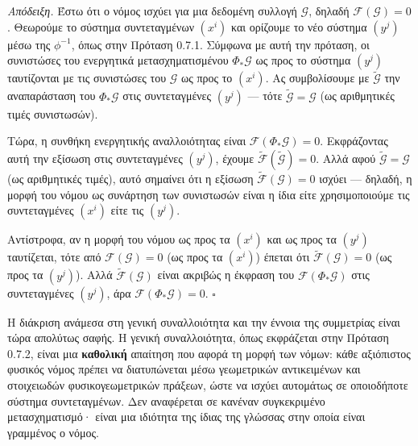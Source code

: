 \documentclass[12pt]{article}
\begin{document}
\textit{Απόδειξη.} Έστω ότι ο νόμος ισχύει για μια δεδομένη συλλογή $\mathcal{G}$, δηλαδή $\mathcal{F}(\mathcal{G}) = 0$. Θεωρούμε το σύστημα συντεταγμένων $(x^i)$ και ορίζουμε το νέο σύστημα $(y^j)$ μέσω της $\phi^{-1}$, όπως στην Πρόταση 0.7.1. Σύμφωνα με αυτή την πρόταση, οι συνιστώσες του ενεργητικά μετασχηματισμένου $\Phi_* \mathcal{G}$ ως προς το σύστημα $(y^j)$ ταυτίζονται με τις συνιστώσες του $\mathcal{G}$ ως προς το $(x^i)$. Ας συμβολίσουμε με $\tilde{\mathcal{G}}$ την αναπαράσταση του $\Phi_* \mathcal{G}$ στις συντεταγμένες $(y^j)$ — τότε $\tilde{\mathcal{G}} = \mathcal{G}$ (ως αριθμητικές τιμές συνιστωσών).

Τώρα, η συνθήκη ενεργητικής αναλλοιότητας είναι $\mathcal{F}(\Phi_* \mathcal{G}) = 0$. Εκφράζοντας αυτή την εξίσωση στις συντεταγμένες $(y^j)$, έχουμε $\tilde{\mathcal{F}}(\tilde{\mathcal{G}}) = 0$. Αλλά αφού $\tilde{\mathcal{G}} = \mathcal{G}$ (ως αριθμητικές τιμές), αυτό σημαίνει ότι η εξίσωση $\tilde{\mathcal{F}}(\mathcal{G}) = 0$ ισχύει — δηλαδή, η μορφή του νόμου ως συνάρτηση των συνιστωσών είναι η ίδια είτε χρησιμοποιούμε τις συντεταγμένες $(x^i)$ είτε τις $(y^j)$.

Αντίστροφα, αν η μορφή του νόμου ως προς τα $(x^i)$ και ως προς τα $(y^j)$ ταυτίζεται, τότε από $\mathcal{F}(\mathcal{G}) = 0$ (ως προς τα $(x^i)$) έπεται ότι $\tilde{\mathcal{F}}(\mathcal{G}) = 0$ (ως προς τα $(y^j)$). Αλλά $\tilde{\mathcal{F}}(\mathcal{G})$ είναι ακριβώς η έκφραση του $\mathcal{F}(\Phi_* \mathcal{G})$ στις συντεταγμένες $(y^j)$, άρα $\mathcal{F}(\Phi_* \mathcal{G}) = 0$. $\square$

Η διάκριση ανάμεσα στη γενική συναλλοιότητα και την έννοια της συμμετρίας είναι τώρα απολύτως σαφής. Η γενική συναλλοιότητα, όπως εκφράζεται στην Πρόταση 0.7.2, είναι μια \textbf{καθολική} απαίτηση που αφορά τη μορφή των νόμων: κάθε αξιόπιστος φυσικός νόμος πρέπει να διατυπώνεται μέσω γεωμετρικών αντικειμένων και στοιχειωδών φυσικογεωμετρικών πράξεων, ώστε να ισχύει αυτομάτως σε οποιοδήποτε σύστημα συντεταγμένων. Δεν αναφέρεται σε κανέναν συγκεκριμένο μετασχηματισμό· είναι μια ιδιότητα της ίδιας της γλώσσας στην οποία είναι γραμμένος ο νόμος.
\end{document}
